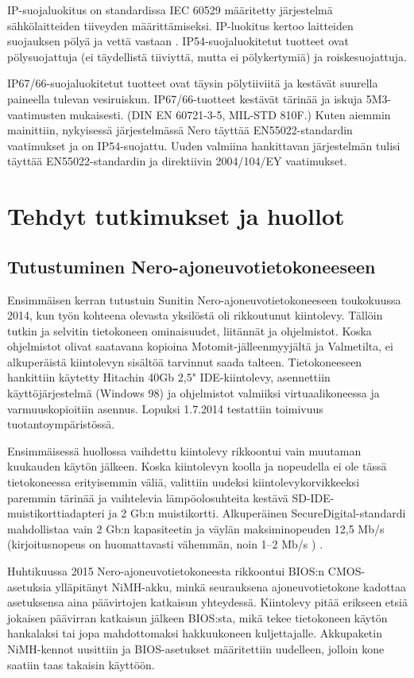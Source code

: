 IP-suojaluokitus on standardissa IEC 60529 määritetty järjestelmä sähkölaitteiden tiiveyden määrittämiseksi. IP-luokitus kertoo laitteiden suojauksen pölyä ja vettä vastaan \cite{IEC60529}. IP54-suojaluokitetut tuotteet ovat pölysuojattuja (ei täydellistä tiiviyttä, mutta ei pölykertymiä) ja roiskesuojattuja.

IP67/66-suojaluokitetut tuotteet ovat täysin pölytiiviitä ja kestävät suurella paineella tulevan vesiruiskun. IP67/66-tuotteet kestävät tärinää ja iskuja 5M3-vaatimusten mukaisesti. (DIN EN 60721-3-5, MIL-STD 810F.) Kuten aiemmin mainittiin, nykyisessä järjestelmässä Nero täyttää EN55022-standardin vaatimukset ja on IP54-suojattu. Uuden valmiina hankittavan järjestelmän tulisi täyttää EN55022-standardin ja direktiivin  2004/104/EY vaatimukset.

\newpage
\chapter{Tehdyt tutkimukset ja huollot}

\section{Tutustuminen Nero-ajoneuvotietokoneeseen}

Ensimmäisen kerran tutustuin Sunitin Nero-ajoneuvotietokoneeseen toukokuussa 2014, kun työn kohteena olevasta yksilöstä oli rikkoutunut kiintolevy. Tällöin tutkin ja selvitin tietokoneen ominaisuudet, liitännät ja ohjelmistot. Koska ohjelmistot olivat saatavana kopioina Motomit-jälleenmyyjältä ja Valmetilta, ei alkuperäistä kiintolevyn sisältöä tarvinnut saada talteen. Tietokoneeseen hankittiin käytetty Hitachin 40Gb 2,5" IDE-kiintolevy, asennettiin käyttöjärjestelmä (Windows 98) ja ohjelmistot valmiiksi virtuaalikoneessa ja varmuuskopioitiin asennus. Lopuksi 1.7.2014 testattiin toimivuus tuotantoympäristössä.

Ensimmäisessä huollossa vaihdettu kiintolevy rikkoontui vain muutaman kuukauden käytön jälkeen. Koska kiintolevyn koolla ja nopeudella ei ole tässä tietokoneessa erityisemmin väliä, valittiin uudeksi kiintolevykorvikkeeksi paremmin tärinää ja vaihtelevia lämpöolosuhteita kestävä SD-IDE-muistikorttiadapteri ja 2 Gb:n muistikortti. Alkuperäinen SecureDigital-standardi mahdollistaa vain 2 Gb:n kapasiteetin ja väylän maksiminopeuden 12,5 Mb/s (kirjoitusnopeus on huomattavasti vähemmän, noin 1--2 Mb/s ) \cite{sd:2gb}.

Huhtikuussa 2015 Nero-ajoneuvotietokoneesta rikkoontui BIOS:n CMOS-asetuksia ylläpitänyt NiMH-akku, minkä seurauksena ajoneuvotietokone kadottaa asetuksensa aina päävirtojen katkaisun yhteydessä. Kiintolevy pitää erikseen etsiä jokaisen päävirran katkaisun jälkeen BIOS:sta, mikä tekee tietokoneen käytön hankalaksi tai jopa mahdottomaksi hakkuukoneen kuljettajalle. Akkupaketin NiMH-kennot uusittiin ja BIOS-asetukset määritettiin uudelleen, jolloin kone saatiin taas takaisin käyttöön.

